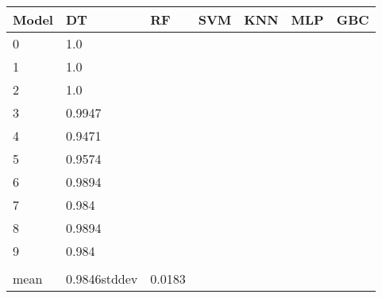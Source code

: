\begin{table}[!h]
\begin{tabular}{l| l  l  l  l  l  l}
Model & DT & RF & SVM & KNN & MLP & GBC \\\hline
0&1.0\\
1&1.0\\
2&1.0\\
3&0.9947\\
4&0.9471\\
5&0.9574\\
6&0.9894\\
7&0.984\\
8&0.9894\\
9&0.984\\
\\\hline
mean&0.9846stddev&0.0183\\\hline
\end{tabular}
\caption{}
\end{table}
